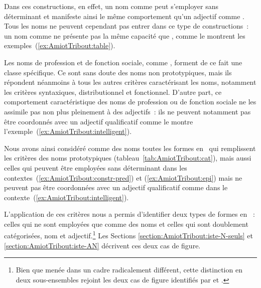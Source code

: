 \documentclass[output=paper]{LSP/langsci}
\begin{document}
Dans ces constructions, en effet, un nom comme  peut s'employer sans déterminant et manifeste ainsi le même comportement qu'un adjectif comme .  Tous les noms ne peuvent cependant pas entrer dans ce type de constructions~: un  nom comme  ne présente pas la même capacité que , comme le montrent les exemples~(\ref{ex:AmiotTribout:table}).

\begin{exe}
\ex \label{ex:AmiotTribout:table}
\begin{xlist}
\end{xlist}
\end{exe}

Les noms de profession et de fonction sociale, comme , forment de ce fait une classe spécifique. Ce sont sans doute des noms non prototypiques, mais ils répondent néanmoins à tous les autres critères caractérisant les noms, notamment les critères syntaxiques, distributionnel et fonctionnel. D'autre part, ce comportement caractéristique des noms de profession ou de fonction sociale ne les assimile pas non plus pleinement à des adjectifs~: ils ne peuvent notamment pas être coordonnés avec un adjectif qualificatif comme le montre l'exemple~(\ref{ex:AmiotTribout:intelligent}).

\begin{exe}
 \label{ex:AmiotTribout:intelligent}
\end{exe}

Nous avons ainsi considéré comme des noms toutes les formes en \iste\ qui  remplissent les critères des noms prototypiques (tableau~\ref{tab:AmiotTribout:cat}), mais aussi celles qui peuvent être employées sans déterminant dans les contextes~(\ref{ex:AmiotTribout:constr-pred}) et (\ref{ex:AmiotTribout:epi}) mais ne peuvent pas être coordonnées avec un adjectif qualificatif comme dans le contexte~(\ref{ex:AmiotTribout:intelligent}).

L'application de ces critères nous a permis d'identifier deux types de formes en \iste~:
celles qui ne sont employées que comme des noms et celles qui sont doublement catégorisées, nom et adjectif.\footnote{Bien que menée dans un cadre radicalement différent, cette distinction en deux sous-ensembles rejoint les deux cas de figure identifiés par \citep{dubois62} et \citep{dubois99}.} Les Sections \ref{section:AmiotTribout:iste-N-seuls} et \ref{section:AmiotTribout:iste-AN} décrivent ces deux cas de figure.
\end{document}
